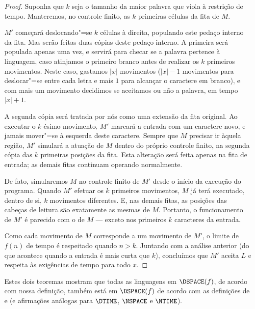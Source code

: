 \begin{proof}
    Suponha que $k$ seja o tamanho da maior palavra
    que viola à restrição de tempo.
    Manteremos, no controle finito,
    as $k$ primeiras células da fita de $M$.

    $M'$ começará deslocando"=se $k$ células à direita,
    populando este pedaço interno da fita.
    Mas serão feitas duas cópias deste pedaço interno.
    A primeira será populada apenas uma vez,
    e servirá para checar se a palavra
    pertence à linguagem,
    caso atinjamos o primeiro branco
    antes de realizar os $k$ primeiros movimentos.
    Neste caso, gastamos $|x|$ movimentos
    ($|x| - 1$ movimentos para deslocar"=se entre cada letra
    e mais $1$ para alcançar o caractere em branco),
    e com mais um movimento
    decidimos se aceitamos ou não a palavra,
    em tempo $|x| + 1$.

    A segunda cópia será tratada por nós
    como uma extensão da fita original.
    Ao executar o $k$-ésimo movimento,
    $M'$ marcará a entrada com um caractere novo,
    e jamais mover"=se à esquerda deste caractere.
    Sempre que $M$ precisar ir àquela região,
    $M'$ simulará a atuação de $M$
    dentro do próprio controle finito,
    na segunda cópia das $k$ primeiras posições da fita.
    Esta alteração será feita apenas na fita de entrada;
    as demais fitas continuam operando normalmente.

    De fato, simularemos $M$ no controle finito de $M'$
    desde o início da execução do programa.
    Quando $M'$ efetuar os $k$ primeiros movimentos,
    $M$ já terá executado, dentro de si,
    $k$ movimentos diferentes.
    E, nas demais fitas, as posições das cabeças de leitura
    são exatamente as mesmas de $M$.
    Portanto,
    o funcionamento de $M'$
    é parecido com o de $M$
    --- exceto nos primeiros $k$ caracteres da entrada.

    Como cada movimento de $M$ corresponde a um movimento de $M'$,
    o limite de $f(n)$ de tempo é respeitado
    quando $n > k$.
    Juntando com a análise anterior
    (do que acontece quando a entrada é mais curta que $k$),
    concluímos que $M'$ aceita $L$ e respeita às exigências de tempo
    para todo $x$.
\end{proof}

Estes dois teoremas mostram que
todas as linguagens em $\DSPACE(f)$,
de acordo com nossa definição,
também está em $\DSPACE(f)$
de acordo com as definições de 
e 
(e afirmações análogas para $\DTIME$, $\NSPACE$ e $\NTIME$).

